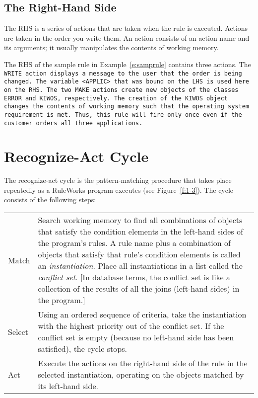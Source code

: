 \subsection{The Right-Hand Side}

The RHS is a series of actions that are taken when the rule is
executed. Actions are taken in the order you write them. An action
consists of an action name and its arguments; it usually manipulates
the contents of working memory.

The RHS of the sample rule in Example~\ref{e:samprule} contains three
actions. The \tt{WRITE} action displays a message to the user that the
order is being changed. The variable \tt{<APPLIC>} that was bound on
the LHS is used here on the RHS. The two \tt{MAKE} actions create new
objects of the classes \tt{ERROR} and \tt{KIWOS}, respectively. The
creation of the \tt{KIWOS} object changes the contents of working
memory such that the operating system requirement is met. Thus, this
rule will fire only once even if the customer orders all three
applications.

\section{Recognize-Act Cycle}

The recognize-act cycle is the pattern-matching procedure that takes
place repeatedly as a RuleWorks program executes (see
Figure~\ref{f:1-3}). The cycle consists of the following steps:

\begin{center}
  \def\arraystretch{1.2}
  \begin{tabularx}{\columnwidth}{lX}
    Match  & Search working memory to find
             all combinations of objects
             that satisfy the condition  
             elements in the left-hand sides 
             of the program's rules. A rule 
             name plus a combination of     
             objects that satisfy that     
             rule's condition elements is    
             called an \emph{instantiation}. Place 
             all instantiations in a list   
             called the \emph{conflict set}. [In   
             database terms, the conflict    
             set is like a collection of the 
             results of all the joins        
             (left-hand sides) in the
             program.] \\
    Select & Using an ordered sequence of  
             criteria, take the             
             instantiation with the highest 
             priority out of the conflict    
             set. If the conflict set is     
             empty (because no left-hand     
             side has been satisfied), the   
             cycle stops.                 \\
    Act    & Execute the actions on the      
             right-hand side of the rule in  
             the selected instantiation,     
             operating on the objects       
             matched by its left-hand side. 
  \end{tabularx}
\end{center}

